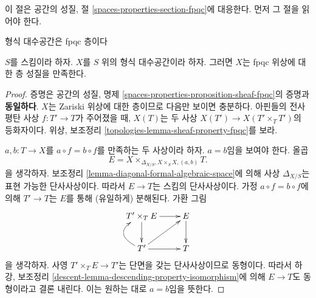 \noindent
이 절은 공간의 성질, 절
\ref{spaces-properties-section-fpqc}에 대응한다. 먼저 그 절을 읽어야 한다.

\begin{lemma}
\label{lemma-sheaf-fpqc}
\begin{slogan}
형식 대수공간은 fpqc 층이다
\end{slogan}
$S$를 스킴이라 하자. $X$를 $S$ 위의 형식 대수공간이라 하자.
그러면 $X$는 fpqc 위상에 대한 층 성질을 만족한다.
\end{lemma}

\begin{proof}
증명은 공간의 성질, 명제
\ref{spaces-properties-proposition-sheaf-fpqc}의 증명과 {\bf 동일하다}.
$X$는 Zariski 위상에 대한 층이므로 다음만 보이면 충분하다.
아핀들의 전사 평탄 사상 $f : T' \to T$가 주어졌을 때,
$X(T)$는 두 사상 $X(T') \to X(T' \times_T T')$의 등화자이다.
위상, 보조정리 \ref{topologies-lemma-sheaf-property-fpqc}를 보라.

\medskip\noindent
$a, b : T \to X$를 $a \circ f = b \circ f$를 만족하는 두 사상이라
하자. $a = b$임을 보여야 한다. 올곱
$$
E = X \times_{\Delta_{X/S}, X \times_S X, (a, b)} T.
$$
을 생각하자. 보조정리 \ref{lemma-diagonal-formal-algebraic-space}에 의해
사상 $\Delta_{X/S}$는 표현 가능한 단사사상이다. 따라서
$E \to T$는 스킴의 단사사상이다. 가정 $a \circ f = b \circ f$에 의해
$T' \to T$는 $E$를 통해 (유일하게) 분해된다. 가환 그림
$$
\xymatrix{
T' \times_T E \ar[r] \ar[d] & E \ar[d] \\
T' \ar[r] \ar@/^5ex/[u] \ar[ru] & T
}
$$
을 생각하자. 사영 $T' \times_T E \to T'$는 단면을 갖는 단사사상이므로
동형이다. 따라서 하강, 보조정리
\ref{descent-lemma-descending-property-isomorphism}에 의해 $E \to T$도
동형이라고 결론 내린다. 이는 원하는 대로 $a = b$임을 뜻한다.


\end{proof}
